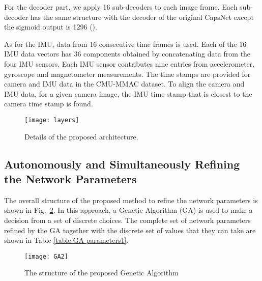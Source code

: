 \documentclass[10pt,twocolumn,letterpaper]{article}
\begin{document}
For the decoder part, we apply 16 sub-decoders to each image frame. Each sub-decoder has the same structure with the decoder of the original CapsNet except the sigmoid output is 1296 ().

As for the IMU, data from 16 consecutive time frames is used. Each of the 16 IMU data vectors has 36 components obtained by concatenating data from the four IMU sensors. Each IMU sensor contributes nine entries from accelerometer, gyroscope and magnetometer measurements. The time stamps are provided for camera and IMU data in the CMU-MMAC dataset. To align the camera and IMU data, for a given camera image, the IMU time stamp that is closest to the camera time stamp is found.


\begin{figure}[h!]
\vspace{-0.2cm}
  \centering
   \centerline{\texttt{[image: layers]}}
\caption{{\small{Details of the proposed architecture.}}}
\label{fig:network_details}
\vspace{-0.2cm}
\end{figure}

\vspace{-0.3cm}
\subsection{Autonomously and Simultaneously Refining the Network Parameters} \label{ssec:prmChoice} \vspace{-0.15cm}

The overall structure of the proposed method to refine the network parameters is shown in Fig.~\ref{fig:GA}. In this approach, a Genetic Algorithm (GA) is used to make a decision from a set of discrete choices. The complete set of network parameters refined by the GA together with the discrete set of values that they can take are shown in Table \ref{table:GA parameters1}.

\begin{figure}[h!]
\vspace{-0.2cm}
  \centering
   \centerline{\texttt{[image: GA2]}}
\caption{{\small{The structure of the proposed Genetic Algorithm}}}
\label{fig:GA}
\vspace{-0.3cm}
\end{figure}
\end{document}
